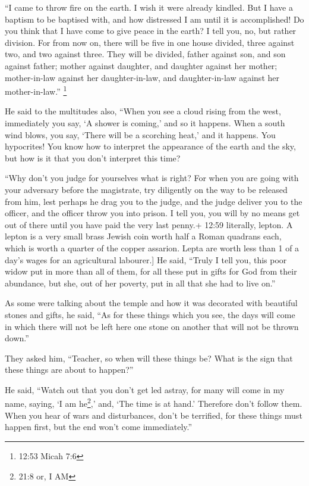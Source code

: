  ``I came to throw fire on the earth. I wish it were
already kindled.  But I have a baptism to be baptised with,
and how distressed I am until it is accomplished!  Do you
think that I have come to give peace in the earth? I tell you, no, but
rather division.  For from now on, there will be five in
one house divided, three against two, and two against three.
 They will be divided, father against son, and son against
father; mother against daughter, and daughter against her mother;
mother-in-law against her daughter-in-law, and daughter-in-law against
her mother-in-law.'' \footnote{12:53 Micah 7:6}

 He said to the multitudes also, ``When you see a cloud
rising from the west, immediately you say, `A shower is coming,' and so
it happens.  When a south wind blows, you say, `There will
be a scorching heat,' and it happens.  You hypocrites! You
know how to interpret the appearance of the earth and the sky, but how
is it that you don't interpret this time?

 ``Why don't you judge for yourselves what is right?
 For when you are going with your adversary before the
magistrate, try diligently on the way to be released from him, lest
perhaps he drag you to the judge, and the judge deliver you to the
officer, and the officer throw you into prison.  I tell
you, you will by no means get out of there until you have paid the very
last penny.+ 12:59 literally, lepton. A lepton is a very small brass
Jewish coin worth half a Roman quadrans each, which is worth a quarter
of the copper assarion. Lepta are worth less than 1 of a day's wages for
an agricultural labourer.{]}  He said, ``Truly I tell you,
this poor widow put in more than all of them,  for all these
put in gifts for God from their abundance, but she, out of her poverty,
put in all that she had to live on.''

 As some were talking about the temple and how it was
decorated with beautiful stones and gifts, he said,  ``As
for these things which you see, the days will come in which there will
not be left here one stone on another that will not be thrown down.''

 They asked him, ``Teacher, so when will these things be?
What is the sign that these things are about to happen?''

 He said, ``Watch out that you don't get led astray, for
many will come in my name, saying, `I am he\footnote{21:8 or, I AM},'
and, `The time is at hand.' Therefore don't follow them. 
When you hear of wars and disturbances, don't be terrified, for these
things must happen first, but the end won't come immediately.''

